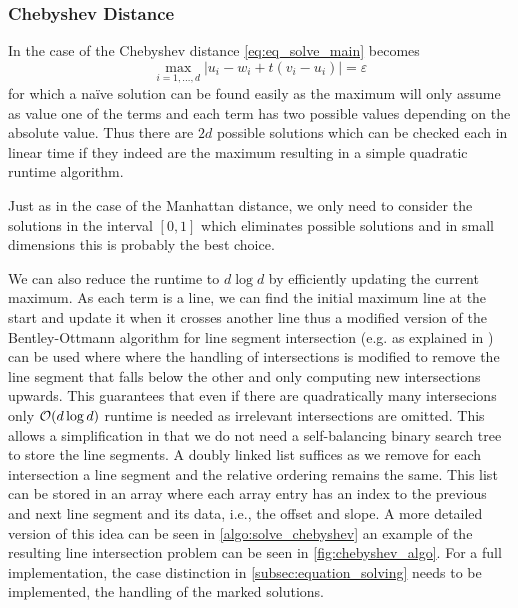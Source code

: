 \subsubsection{Chebyshev Distance}
\label{subsubsec:eq_chebyshev_distance}
In the case of the Chebyshev distance \cref{eq:eq_solve_main} becomes 
\begin{equation}
  \max_{i = 1,\dots, d} |u_i - w_i + t(v_i - u_i)| = \varepsilon\label{eq:solve_chebyshev}
\end{equation}
for which a na\"ive solution can be found easily as the maximum will only assume as value one of the terms and each term has two possible values depending on the absolute value. Thus there are \(2d\) possible solutions which can be checked each in linear time if they indeed are the maximum resulting in a simple quadratic runtime algorithm. 

Just as in the case of the Manhattan distance, we only need to consider the solutions in the interval \([0,1]\) which eliminates possible solutions and in small dimensions this is probably the best choice. 

We can also reduce the runtime to \(d \log d\) by efficiently updating the current maximum. As each term is a line, we can find the initial maximum line at the start and update it when it crosses another line thus a modified version of the Bentley-Ottmann algorithm for line segment intersection (e.g. as explained in \cite{computational_geometry}) can be used where where the handling of intersections is modified to remove the line segment that falls below the other and only computing new intersections upwards. This guarantees that even if there are quadratically many intersecions only \(\mathcal{O}(d \log d)\) runtime is needed as irrelevant intersections are omitted. 
This allows a simplification in that we do not need a self-balancing binary search tree to store the line segments. A doubly linked list suffices as we remove for each intersection a line segment and the relative ordering remains the same. This list can be stored in an array where each array entry has an index to the previous and next line segment and its data, i.e., the offset and slope. A more detailed version of this idea can be seen in \cref{algo:solve_chebyshev} an example of the resulting line intersection problem can be seen in \cref{fig:chebyshev_algo}. For a full implementation, the case distinction in \cref{subsec:equation_solving} needs to be implemented, the handling of the marked solutions.

